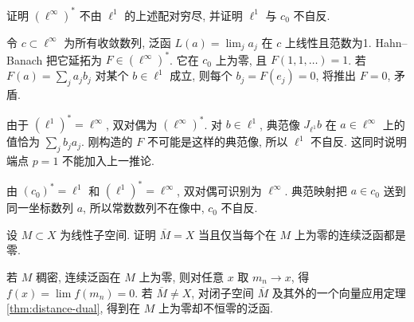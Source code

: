 \begin{example}\label{legacy:ch03:example1}
证明 $(\ell^\infty)^*$ 不由 $\ell^1$ 的上述配对穷尽, 并证明 $\ell^1$ 与 $c_0$ 不自反.
\end{example}
\begin{solution}
令 $c\subset\ell^\infty$ 为所有收敛数列, 泛函 $L(a)=\lim_j a_j$ 在 $c$ 上线性且范数为1. Hahn--Banach 把它延拓为 $F\in(\ell^\infty)^*$. 它在 $c_0$ 上为零, 且 $F(1,1,\ldots)=1$. 若 $F(a)=\sum_ja_jb_j$ 对某个 $b\in\ell^1$ 成立, 则每个 $b_j=F(e_j)=0$, 将推出 $F=0$, 矛盾.

由于 $(\ell^1)^*=\ell^\infty$, 双对偶为 $(\ell^\infty)^*$. 对 $b\in\ell^1$, 典范像 $J_{\ell^1}b$ 在 $a\in\ell^\infty$ 上的值恰为 $\sum_jb_ja_j$. 刚构造的 $F$ 不可能是这样的典范像, 所以 $\ell^1$ 不自反. 这同时说明端点 $p=1$ 不能加入上一推论.

由 $(c_0)^*=\ell^1$ 和 $(\ell^1)^*=\ell^\infty$, 双对偶可识别为 $\ell^\infty$. 典范映射把 $a\in c_0$ 送到同一坐标数列 $a$, 所以常数数列不在像中, $c_0$ 不自反.
\end{solution}

\begin{exercise}\label{legacy:ch03:exercise1}
设 $M\subset X$ 为线性子空间. 证明 $\overline M=X$ 当且仅当每个在 $M$ 上为零的连续泛函都是零.
\end{exercise}
\begin{solution}
若 $M$ 稠密, 连续泛函在 $M$ 上为零, 则对任意 $x$ 取 $m_n\to x$, 得 $f(x)=\lim f(m_n)=0$. 若 $\overline M\ne X$, 对闭子空间 $\overline M$ 及其外的一个向量应用定理\ref{thm:distance-dual}, 得到在 $M$ 上为零却不恒零的泛函.
\end{solution}
